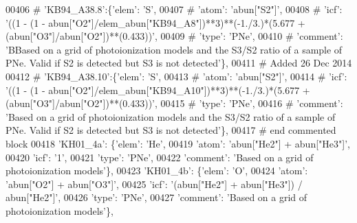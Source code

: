 \begin{DoxyCode}
00406 \textcolor{comment}{#                         'KB94\_A38.8':\{'elem': 'S',}
00407 \textcolor{comment}{#                                     'atom': 'abun["S2"]',}
00408 \textcolor{comment}{#                                     'icf': '((1 - (1 -
       abun["O2"]/elem\_abun["KB94\_A8"])**3)**(-1./3.)*(5.677 + (abun["O3"]/abun["O2"])**(0.433))',}
00409 \textcolor{comment}{#                                      'type': 'PNe',}
00410 \textcolor{comment}{#                                      'comment': 'BBased on a grid of photoionization models and the S3/S2
       ratio of a sample of PNe. Valid if S2 is detected but S3 is not detected'\},}
00411 \textcolor{comment}{# Added 26 Dec 2014}
00412 \textcolor{comment}{#                         'KB94\_A38.10':\{'elem': 'S',}
00413 \textcolor{comment}{#                                     'atom': 'abun["S2"]',}
00414 \textcolor{comment}{#                                     'icf': '((1 - (1 -
       abun["O2"]/elem\_abun["KB94\_A10"])**3)**(-1./3.)*(5.677 + (abun["O3"]/abun["O2"])**(0.433))',}
00415 \textcolor{comment}{#                                      'type': 'PNe',}
00416 \textcolor{comment}{#                                      'comment': 'Based on a grid of photoionization models and the S3/S2
       ratio of a sample of PNe. Valid if S2 is detected but S3 is not detected'\},}
00417 \textcolor{comment}{# end commented block}
00418                          \textcolor{stringliteral}{'KH01\_4a'}: \{\textcolor{stringliteral}{'elem'}: \textcolor{stringliteral}{'He'},
00419                                      \textcolor{stringliteral}{'atom'}: \textcolor{stringliteral}{'abun["He2"] + abun["He3"]'},
00420                                      \textcolor{stringliteral}{'icf'}: \textcolor{stringliteral}{'1'},
00421                                      \textcolor{stringliteral}{'type'}: \textcolor{stringliteral}{'PNe'},
00422                                      \textcolor{stringliteral}{'comment'}: \textcolor{stringliteral}{'Based on a grid of photoionization models'}\},
00423                          \textcolor{stringliteral}{'KH01\_4b'}: \{\textcolor{stringliteral}{'elem'}: \textcolor{stringliteral}{'O'},
00424                                      \textcolor{stringliteral}{'atom'}: \textcolor{stringliteral}{'abun["O2"] + abun["O3"]'},
00425                                      \textcolor{stringliteral}{'icf'}: \textcolor{stringliteral}{'(abun["He2"] + abun["He3"]) / abun["He2"]'},
00426                                      \textcolor{stringliteral}{'type'}: \textcolor{stringliteral}{'PNe'},
00427                                      \textcolor{stringliteral}{'comment'}: \textcolor{stringliteral}{'Based on a grid of photoionization models'}\},

\end{DoxyCode}
